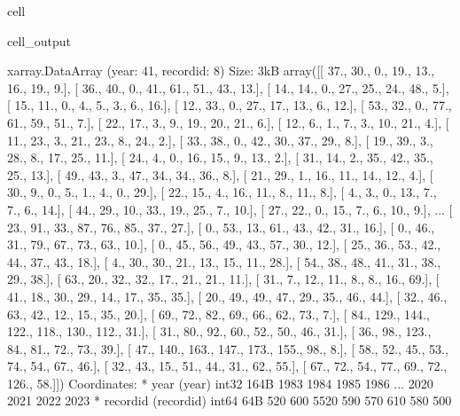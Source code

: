 \documentclass[letterpaper,10pt,english]{jupyterBook}
\begin{document}
\begin{sphinxuseclass}{cell}
\begin{sphinxVerbatimOutput}
\begin{sphinxuseclass}{cell_output}
\begin{sphinxVerbatim}[commandchars=\\\{\}]
\PYGZlt{}xarray.DataArray (year: 41, record\PYGZus{}id: 8)\PYGZgt{} Size: 3kB
array([[ 37.,  30.,   0.,  19.,  13.,  16.,  19.,   9.],
       [ 36.,  40.,   0.,  41.,  61.,  51.,  43.,  13.],
       [ 14.,  14.,   0.,  27.,  25.,  24.,  48.,   5.],
       [ 15.,  11.,   0.,   4.,   5.,   3.,   6.,  16.],
       [ 12.,  33.,   0.,  27.,  17.,  13.,   6.,  12.],
       [ 53.,  32.,   0.,  77.,  61.,  59.,  51.,   7.],
       [ 22.,  17.,   3.,   9.,  19.,  20.,  21.,   6.],
       [ 12.,   6.,   1.,   7.,   3.,  10.,  21.,   4.],
       [ 11.,  23.,   3.,  21.,  23.,   8.,  24.,   2.],
       [ 33.,  38.,   0.,  42.,  30.,  37.,  29.,   8.],
       [ 19.,  39.,   3.,  28.,   8.,  17.,  25.,  11.],
       [ 24.,   4.,   0.,  16.,  15.,   9.,  13.,   2.],
       [ 31.,  14.,   2.,  35.,  42.,  35.,  25.,  13.],
       [ 49.,  43.,   3.,  47.,  34.,  34.,  36.,   8.],
       [ 21.,  29.,   1.,  16.,  11.,  14.,  12.,   4.],
       [ 30.,   9.,   0.,   5.,   1.,   4.,   0.,  29.],
       [ 22.,  15.,   4.,  16.,  11.,   8.,  11.,   8.],
       [  4.,   3.,   0.,  13.,   7.,   7.,   6.,  14.],
       [ 44.,  29.,  10.,  33.,  19.,  25.,   7.,  10.],
       [ 27.,  22.,   0.,  15.,   7.,   6.,  10.,   9.],
...
       [ 23.,  91.,  33.,  87.,  76.,  85.,  37.,  27.],
       [  0.,  53.,  13.,  61.,  43.,  42.,  31.,  16.],
       [  0.,  46.,  31.,  79.,  67.,  73.,  63.,  10.],
       [  0.,  45.,  56.,  49.,  43.,  57.,  30.,  12.],
       [ 25.,  36.,  53.,  42.,  44.,  37.,  43.,  18.],
       [  4.,  30.,  30.,  21.,  13.,  15.,  11.,  28.],
       [ 54.,  38.,  48.,  41.,  31.,  38.,  29.,  38.],
       [ 63.,  20.,  32.,  32.,  17.,  21.,  21.,  11.],
       [ 31.,   7.,  12.,  11.,   8.,   8.,  16.,  69.],
       [ 41.,  18.,  30.,  29.,  14.,  17.,  35.,  35.],
       [ 20.,  49.,  49.,  47.,  29.,  35.,  46.,  44.],
       [ 32.,  46.,  63.,  42.,  12.,  15.,  35.,  20.],
       [ 69.,  72.,  82.,  69.,  66.,  62.,  73.,   7.],
       [ 84., 129., 144., 122., 118., 130., 112.,  31.],
       [ 31.,  80.,  92.,  60.,  52.,  50.,  46.,  31.],
       [ 36.,  98., 123.,  84.,  81.,  72.,  73.,  39.],
       [ 47., 140., 163., 147., 173., 155.,  98.,   8.],
       [ 58.,  52.,  45.,  53.,  74.,  54.,  67.,  46.],
       [ 32.,  43.,  15.,  51.,  44.,  31.,  62.,  55.],
       [ 67.,  72.,  54.,  77.,  69.,  72., 126.,  58.]])
Coordinates:
  * year       (year) int32 164B 1983 1984 1985 1986 ... 2020 2021 2022 2023
  * record\PYGZus{}id  (record\PYGZus{}id) int64 64B 520 600 5520 590 570 610 580 500
\end{sphinxVerbatim}

\end{sphinxuseclass}\end{sphinxVerbatimOutput}

\end{sphinxuseclass}
\end{document}
